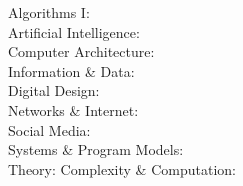 \documentclass{article}
\begin{document}
\begin{description}
\item[{\sf Algorithms I:}]
\begin{itemize}

\end{itemize}

\item[{\sf Artificial Intelligence:}]
\begin{itemize}

\end{itemize}

\item[{\sf Computer Architecture:}]
\begin{itemize}

\end{itemize}

\item[{\sf Information \& Data:}]
\begin{itemize}

\end{itemize}

\item[{\sf Digital Design:}]
\begin{itemize}

\end{itemize}

\item[{\sf Networks \& Internet:}]
\begin{itemize}

\end{itemize}

\item[{\sf Social Media:}]
\begin{itemize}

\end{itemize}

\item[{\sf Systems \& Program Models:}]
\begin{itemize}

\end{itemize}

\item[{\sf Theory: Complexity \& Computation:}]
\begin{itemize}

\end{itemize}
\end{description}
\end{document}
